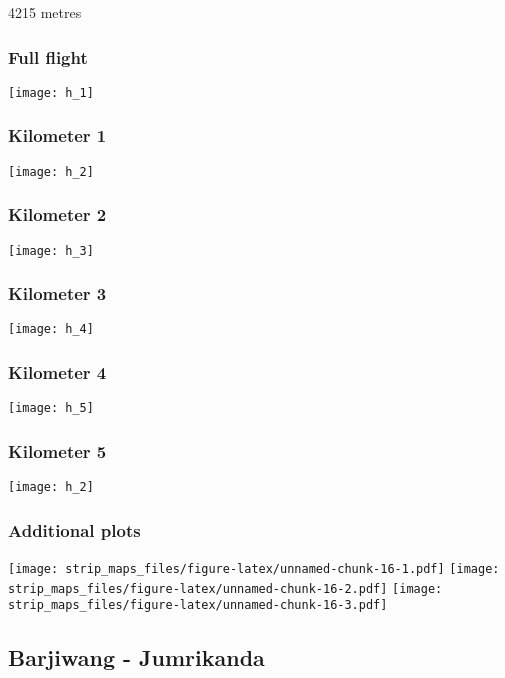 \documentclass[]{article}
\begin{document}
4215 metres

\subsubsection{Full flight}\label{full-flight-7}

\texttt{[image: h\_1]}

\subsubsection{Kilometer 1}\label{kilometer-1-7}

\texttt{[image: h\_2]}

\subsubsection{Kilometer 2}\label{kilometer-2-7}

\texttt{[image: h\_3]}

\subsubsection{Kilometer 3}\label{kilometer-3-7}

\texttt{[image: h\_4]}

\subsubsection{Kilometer 4}\label{kilometer-4-7}

\texttt{[image: h\_5]}

\subsubsection{Kilometer 5}\label{kilometer-5-7}

\texttt{[image: h\_2]}

\subsubsection{Additional plots}\label{additional-plots-7}

\texttt{[image: strip\_maps\_files/figure-latex/unnamed-chunk-16-1.pdf]}
\texttt{[image: strip\_maps\_files/figure-latex/unnamed-chunk-16-2.pdf]}
\texttt{[image: strip\_maps\_files/figure-latex/unnamed-chunk-16-3.pdf]}

\newpage

\subsection{Barjiwang - Jumrikanda}\label{barjiwang---jumrikanda}
\end{document}
